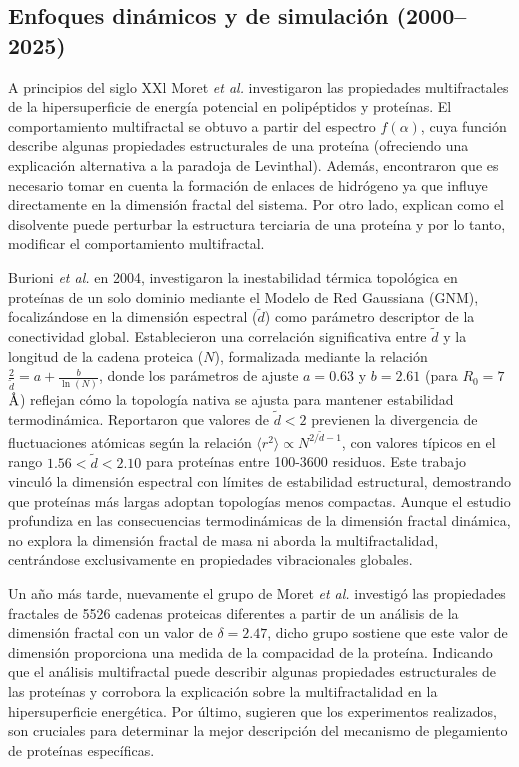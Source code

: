 \subsection{Enfoques din\'{a}micos y de simulaci\'{o}n (2000--2025)}


A principios del siglo XXl Moret \textit{et al.}\cite{Moret2001} investigaron las propiedades multifractales de la hipersuperficie de energ\'{i}a potencial en polip\'{e}ptidos y prote\'{i}nas. El comportamiento multifractal se obtuvo a partir del espectro $f(\alpha)$, cuya funci\'{o}n describe algunas propiedades estructurales de una prote\'{i}na (ofreciendo una explicaci\'{o}n alternativa a la paradoja de Levinthal). Adem\'{a}s, encontraron que es necesario tomar en cuenta la formaci\'{o}n de enlaces de hidr\'{o}geno ya que influye directamente en la dimensi\'{o}n fractal del sistema. Por otro lado, explican como el disolvente puede perturbar la estructura terciaria de una prote\'{i}na y por lo tanto, modificar el comportamiento multifractal.

Burioni \textit{et al.} en 2004, \cite{Burioni2004} investigaron la inestabilidad térmica topológica en proteínas de un solo dominio mediante el Modelo de Red Gaussiana (GNM), focalizándose en la dimensión espectral ($\tilde{d}$) como parámetro descriptor de la conectividad global. Establecieron una correlación significativa entre $\tilde{d}$ y la longitud de la cadena proteica ($N$), formalizada mediante la relación $\frac{2}{\tilde{d}} = a + \frac{b}{\ln(N)}$, donde los parámetros de ajuste $a = 0.63$ y $b = 2.61$ (para $R_0 = 7$ $\textup{\r{A}}$) reflejan cómo la topología nativa se ajusta para mantener estabilidad termodinámica. Reportaron que valores de $\tilde{d} < 2$ previenen la divergencia de fluctuaciones atómicas según la relación $\langle r^2 \rangle \propto N^{2/\tilde{d}-1}$, con valores típicos en el rango $1.56 < \tilde{d} < 2.10$ para proteínas entre 100-3600 residuos. Este trabajo vinculó la dimensión espectral con límites de estabilidad estructural, demostrando que proteínas más largas adoptan topologías menos compactas. Aunque el estudio profundiza en las consecuencias termodinámicas de la dimensión fractal dinámica, no explora la dimensión fractal de masa ni aborda la multifractalidad, centrándose exclusivamente en propiedades vibracionales globales.

Un año m\'{a}s tarde, nuevamente el grupo de Moret \textit{et al.} \cite{Moret2005} investig\'{o} las propiedades fractales de 5526 cadenas proteicas diferentes a partir de un an\'{a}lisis de la dimensi\'{o}n fractal con un valor de $\delta = 2.47$, dicho grupo sostiene que este valor de dimensi\'{o}n proporciona una medida de la compacidad de la prote\'{i}na. Indicando que el an\'{a}lisis multifractal puede describir algunas propiedades estructurales de las prote\'{i}nas y corrobora la explicaci\'{o}n sobre la multifractalidad en la hipersuperficie energ\'{e}tica. Por \'{u}ltimo, sugieren que los experimentos realizados, son cruciales para determinar la mejor descripci\'{o}n del mecanismo de plegamiento de prote\'{i}nas espec\'{i}ficas.

